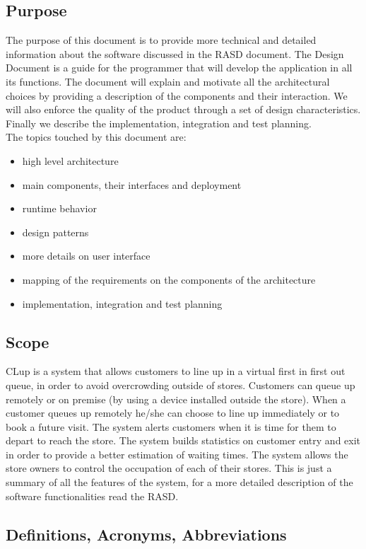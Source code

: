 \subsection{Purpose}
The purpose of this document is to provide more technical and detailed information about the software discussed in the RASD document. The Design Document is a guide for the programmer that will develop the application in all its functions. The document will explain and motivate all the architectural choices by providing a description of the components and their interaction. We will also enforce the quality of the product through a set of design characteristics. Finally we describe the implementation, integration and test planning.\\
The topics touched by this document are:
\begin{itemize}
	\item high level architecture
	\item main components, their interfaces and deployment
	\item runtime behavior
	\item design patterns
	\item more details on user interface
	\item mapping of the requirements on the components of the architecture
	\item implementation, integration and test planning
\end{itemize}

\subsection{Scope}

CLup is a system that allows customers to line up in a virtual first in first out queue, in order to avoid overcrowding outside of stores. Customers can queue up remotely or on premise (by using a device installed outside the store). When a customer queues up remotely he/she can choose to line up immediately or to book a future visit. The system alerts customers when it is time for them to depart to reach the store. The system builds statistics on customer entry and exit in order to provide a better estimation of waiting times. The system allows the store owners to control the occupation of each of their stores. This is just a summary of all the features of the system, for a more detailed description of the software functionalities read the RASD. 
\newpage
\subsection{Definitions, Acronyms, Abbreviations}

